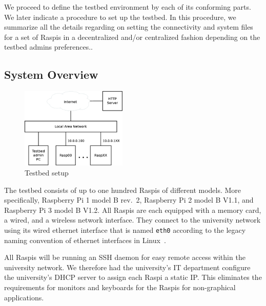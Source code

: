 \label{sec:testbed}

We proceed to define the testbed environment by each of its conforming
parts. We later indicate a procedure to set up the testbed. In this procedure,
we summarize all the details regarding on setting the connectivity and
system files for a set of \ac{Raspi}s in a decentralized and/or centralized fashion
depending on the testbed admins preferences..

\subsection{System Overview}


\begin{figure}[ht!]
\centering
\includegraphics[width=0.45\textwidth]{images/testbed_setup3.eps}
\caption{Testbed setup}
\label{fig:testbed_setup}
\end{figure}

The testbed consists of up to one hundred \ac{Raspi}s of different models.
More specifically, Raspberry Pi 1 model B rev.~2,
Raspberry Pi 2 model B V1.1, and Raspberry Pi 3 model B V1.2.
All \ac{Raspi}s are each equipped with a memory card, a wired, and a wireless
network interface. They connect to the university network using its wired
ethernet interface that is named \texttt{eth0} according to the legacy naming
convention of ethernet interfaces in Linux~\cite{PredictableNetworkInterfaceNames}.

All \ac{Raspi}s will be running an \ac{SSH} daemon for easy remote access
within the university network. We therefore had the university's \ac{IT}
department configure the university's \ac{DHCP} server to assign each \ac{Raspi} a
static \ac{IP}. This eliminates the requirements for monitors and keyboards
for the \ac{Raspi}s for non-graphical applications.

